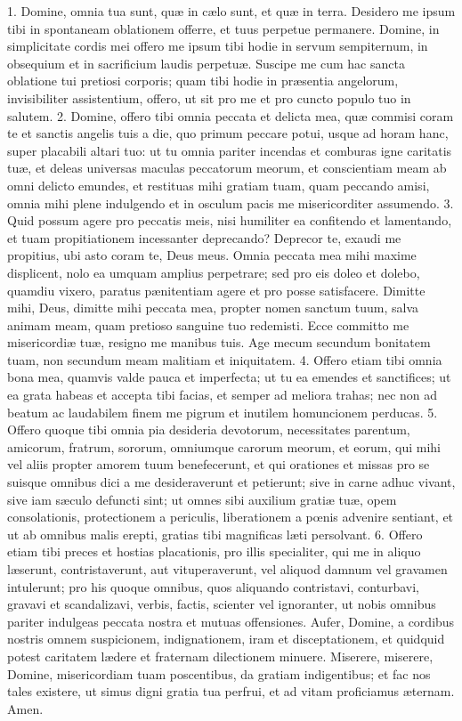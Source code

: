 1. Domine, omnia tua sunt, quæ in cælo sunt, et quæ in terra. Desidero me ipsum tibi in spontaneam oblationem offerre, et tuus perpetue permanere. Domine, in simplicitate cordis mei offero me ipsum tibi hodie in servum sempiternum, in obsequium et in sacrificium laudis perpetuæ. Suscipe me cum hac sancta oblatione tui pretiosi corporis; quam tibi hodie in præsentia angelorum, invisibiliter assistentium, offero, ut sit pro me et pro cuncto populo tuo in salutem.
2. Domine, offero tibi omnia peccata et delicta mea, quæ commisi coram te et sanctis angelis tuis a die, quo primum peccare potui, usque ad horam hanc, super placabili altari tuo: ut tu omnia pariter incendas et comburas igne caritatis tuæ, et deleas universas maculas peccatorum meorum, et conscientiam meam ab omni delicto emundes, et restituas mihi gratiam tuam, quam peccando amisi, omnia mihi plene indulgendo et in osculum pacis me misericorditer assumendo.
3. Quid possum agere pro peccatis meis, nisi humiliter ea confitendo et lamentando, et tuam propitiationem incessanter deprecando? Deprecor te, exaudi me propitius, ubi asto coram te, Deus meus. Omnia peccata mea mihi maxime displicent, nolo ea umquam amplius perpetrare; sed pro eis doleo et dolebo, quamdiu vixero, paratus pænitentiam agere et pro posse satisfacere. Dimitte mihi, Deus, dimitte mihi peccata mea, propter nomen sanctum tuum, salva animam meam, quam pretioso sanguine tuo redemisti. Ecce committo me misericordiæ tuæ, resigno me manibus tuis. Age mecum secundum bonitatem tuam, non secundum meam malitiam et iniquitatem.
4. Offero etiam tibi omnia bona mea, quamvis valde pauca et imperfecta; ut tu ea emendes et sanctifices; ut ea grata habeas et accepta tibi facias, et semper ad meliora trahas; nec non ad beatum ac laudabilem finem me pigrum et inutilem homuncionem perducas.
5. Offero quoque tibi omnia pia desideria devotorum, necessitates parentum, amicorum, fratrum, sororum, omniumque carorum meorum, et eorum, qui mihi vel aliis propter amorem tuum benefecerunt, et qui orationes et missas pro se suisque omnibus dici a me desideraverunt et petierunt; sive in carne adhuc vivant, sive iam sæculo defuncti sint; ut omnes sibi auxilium gratiæ tuæ, opem consolationis, protectionem a periculis, liberationem a pœnis advenire sentiant, et ut ab omnibus malis erepti, gratias tibi magnificas læti persolvant.
6. Offero etiam tibi preces et hostias placationis, pro illis specialiter, qui me in aliquo læserunt, contristaverunt, aut vituperaverunt, vel aliquod damnum vel gravamen intulerunt; pro his quoque omnibus, quos aliquando contristavi, conturbavi, gravavi et scandalizavi, verbis, factis, scienter vel ignoranter, ut nobis omnibus pariter indulgeas peccata nostra et mutuas offensiones. Aufer, Domine, a cordibus nostris omnem suspicionem, indignationem, iram et disceptationem, et quidquid potest caritatem lædere et fraternam dilectionem minuere. Miserere, miserere, Domine, misericordiam tuam poscentibus, da gratiam indigentibus; et fac nos tales existere, ut simus digni gratia tua perfrui, et ad vitam proficiamus æternam. Amen.


